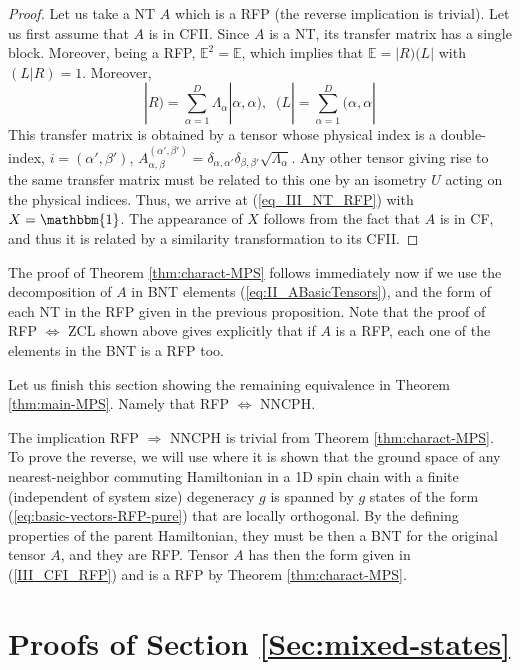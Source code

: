 \documentclass{elsarticle}
\newcommand{\Id}{\mathbbm{1}}
\newcommand{\be}{\begin{equation}}
\newcommand{\ee}{\end{equation}}
\begin{document}
\begin{proof}
    Let us take a NT $A$ which is a RFP (the reverse implication is trivial). Let us first assume that $A$ is in CFII.
    Since $A$ is a NT, its transfer matrix has a single block.
    Moreover, being a RFP, $\mathbb{E}^2=\mathbb{E}$, which implies that $\mathbb{E}=|R)(L|$ with $(L|R)=1$. Moreover,
    \be
        |R)= \sum_{\alpha=1}^D \Lambda_\alpha |\alpha,\alpha),\;\;
        (L|=\sum_{\alpha=1}^D (\alpha,\alpha|
    \ee
    This transfer matrix is obtained by a tensor whose physical index is a double-index, $i=(\alpha',\beta')$,  $A^{(\alpha',\beta')}_{\alpha,\beta}= \delta_{\alpha,\alpha'}\delta_{\beta,\beta'} \sqrt{\Lambda_\alpha}$. Any other tensor giving rise to the same transfer matrix must be related to this one by an isometry $U$ acting on the physical indices. Thus, we arrive at (\ref{eq_III_NT_RFP}) with $X=\Id$. The appearance of $X$ follows from the fact that $A$ is in CF, and thus it is related by a similarity transformation to its CFII.
\end{proof}

The proof of Theorem \ref{thm:charact-MPS} follows immediately now  if we use the decomposition of $A$ in BNT elements (\ref{eq:II_ABasicTensors}), and the form of each NT in the RFP given in the previous proposition. Note that the proof of RFP $\Leftrightarrow$ ZCL shown above gives explicitly that if $A$ is a RFP, each one of the elements in the BNT is a RFP too.

Let us finish this section showing the remaining equivalence in Theorem \ref{thm:main-MPS}. Namely that RFP $\Leftrightarrow$ NNCPH.

The implication RFP $\Rightarrow$ NNCPH is trivial from Theorem \ref{thm:charact-MPS}. To prove the reverse, we will use \cite{Beigi} where it is shown that the ground space of any nearest-neighbor commuting Hamiltonian in a 1D spin chain with a finite (independent of system size) degeneracy $g$ is spanned by $g$ states of the form (\ref{eq:basic-vectors-RFP-pure}) that are locally orthogonal. By the defining properties of the parent Hamiltonian, they must be then a BNT for the original tensor $A$, and they are RFP. Tensor $A$ has then the form given in (\ref{III_CFI_RFP}) and is a RFP by Theorem \ref{thm:charact-MPS}.



\section{Proofs of Section \ref{Sec:mixed-states}}
\label{AppendixMixed}
\end{document}

